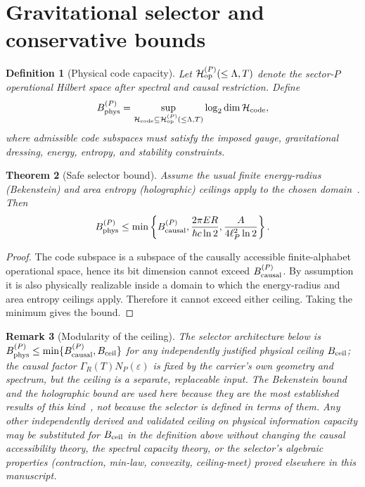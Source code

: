 \documentclass[11pt,a4paper]{article}
\newtheorem{theorem}{Theorem}[section]
\newtheorem{definition}[theorem]{Definition}
\newtheorem{remark}[theorem]{Remark}
\begin{document}
\section{Gravitational selector and conservative bounds}

\begin{definition}[Physical code capacity]
Let $\mathcal H_{\rm op}^{(P)}(\le\Lambda,T)$ denote the sector-$P$ operational Hilbert space after spectral and causal restriction.  Define
\[
B_{\rm phys}^{(P)}=
\sup_{\mathcal H_{\rm code}\subseteq\mathcal H_{\rm op}^{(P)}(\le\Lambda,T)}
\log_2\dim\mathcal H_{\rm code},
\]
where admissible code subspaces must satisfy the imposed gauge, gravitational dressing, energy, entropy, and stability constraints.
\end{definition}

\begin{theorem}[Safe selector bound]
Assume the usual finite energy-radius (Bekenstein) and area entropy (holographic) ceilings apply to the chosen domain~\cite{Bekenstein1973,Bekenstein1981,Bousso2002}.  Then
\[
B_{\rm phys}^{(P)}
\le
\min\left\{
B_{\rm causal}^{(P)},
\frac{2\pi ER}{\hbar c\ln2},
\frac{A}{4\ell_P^2\ln2}
\right\}.
\]
\end{theorem}
\begin{proof}
The code subspace is a subspace of the causally accessible finite-alphabet operational space, hence its bit dimension cannot exceed $B_{\rm causal}^{(P)}$.  By assumption it is also physically realizable inside a domain to which the energy-radius and area entropy ceilings apply.  Therefore it cannot exceed either ceiling.  Taking the minimum gives the bound.\end{proof}

\begin{remark}[Modularity of the ceiling]
The selector architecture below is $B_{\rm phys}^{(P)}\le\min\{B_{\rm causal}^{(P)},B_{\rm ceil}\}$ for \emph{any} independently justified physical ceiling $B_{\rm ceil}$; the causal factor $\Gamma_R(T)N_P(\varepsilon)$ is fixed by the carrier's own geometry and spectrum, but the ceiling is a separate, replaceable input.  The Bekenstein bound and the holographic bound are used here because they are the most established results of this kind~\cite{Bekenstein1973,Bekenstein1981,Bousso2002}, not because the selector is defined in terms of them.  Any other independently derived and validated ceiling on physical information capacity may be substituted for $B_{\rm ceil}$ in the definition above without changing the causal accessibility theory, the spectral capacity theory, or the selector's algebraic properties (contraction, min-law, convexity, ceiling-meet) proved elsewhere in this manuscript.
\end{remark}
\end{document}
